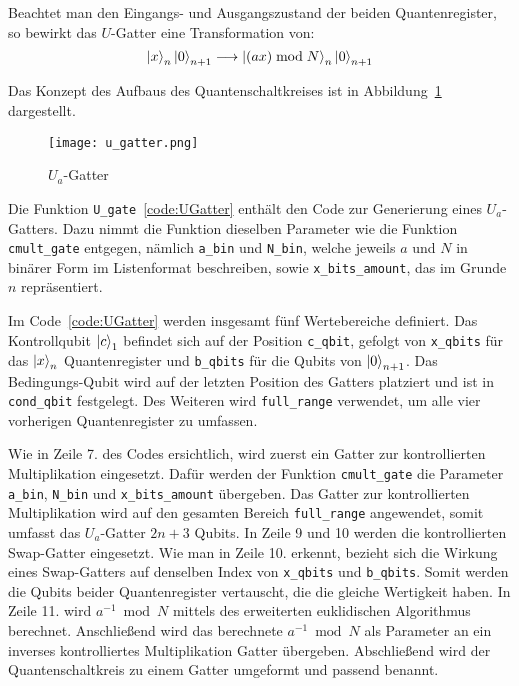 Beachtet man den Eingangs- und Ausgangszustand der beiden Quantenregister, 
so bewirkt das \(U\)-Gatter eine Transformation von:
 \[\ket{x}_{n}\ket{0}_{n+1} 
 \longrightarrow 
 \ket{(ax)\bmod N}_{n}\ket{0}_{n+1}\]

Das Konzept des Aufbaus des Quantenschaltkreises ist in Abbildung~\ref{fig:u_gatter} dargestellt.
\begin{figure} [H]
  \centering
  \texttt{[image: u\_gatter.png]}
  \caption{\(U_a\)-Gatter~\cite{beauregard2003circuit}}
  \label{fig:u_gatter}
\end{figure}

Die Funktion \texttt{U_gate}~\ref{code:UGatter} enthält den Code zur Generierung eines \(U_a\)-Gatters.
Dazu nimmt die Funktion dieselben Parameter wie die Funktion \texttt{cmult_gate} entgegen, 
nämlich  \texttt{a_bin} und \texttt{N_bin}, welche jeweils \(a\) und \(N\) in binärer Form im Listenformat beschreiben,  
sowie \texttt{x_bits_amount}, das im Grunde \(n\) repräsentiert.

Im Code~\ref{code:UGatter} werden insgesamt fünf Wertebereiche definiert.
Das Kontrollqubit \(\ket{c}_1\) befindet sich auf der Position \texttt{c_qbit},
gefolgt von \texttt{x_qbits} für das \(\ket{x}_{n}\) Quantenregister und  
\texttt{b_qbits} für die Qubits von \(\ket{0}_{n+1}\).
Das Bedingungs-Qubit wird auf der letzten Position des Gatters platziert und  
ist in \texttt{cond_qbit} festgelegt.
Des Weiteren wird \texttt{full_range} verwendet,
um alle vier vorherigen Quantenregister zu umfassen.

Wie in Zeile 7. des Codes ersichtlich, wird zuerst ein Gatter zur kontrollierten Multiplikation eingesetzt.
Dafür werden der Funktion \texttt{cmult_gate} die Parameter \texttt{a_bin}, \texttt{N_bin} und \texttt{x_bits_amount} übergeben.
Das Gatter zur kontrollierten Multiplikation wird auf den gesamten Bereich \texttt{full_range} angewendet, 
somit umfasst das \(U_a\)-Gatter \(2n+3\) Qubits.
In Zeile 9 und 10 werden die kontrollierten Swap-Gatter eingesetzt.
Wie man in Zeile 10. erkennt, bezieht sich die Wirkung eines Swap-Gatters auf denselben Index von \texttt{x_qbits} und \texttt{b_qbits}.
Somit werden die Qubits beider Quantenregister vertauscht, die die gleiche Wertigkeit haben.
In Zeile 11. wird \(a^{-1}\bmod N\) mittels des erweiterten euklidischen Algorithmus berechnet.
Anschließend wird das berechnete \(a^{-1}\bmod N\) als Parameter an ein inverses kontrolliertes Multiplikation Gatter übergeben.
Abschließend wird der Quantenschaltkreis zu einem Gatter umgeformt und passend benannt.

